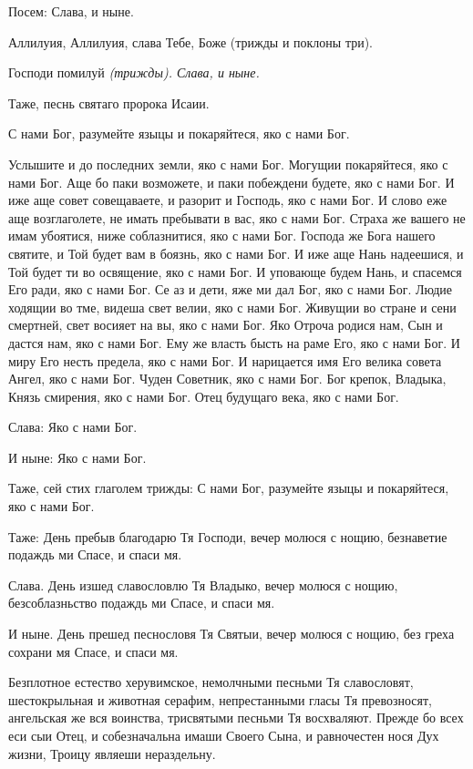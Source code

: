 Посем: Слава, и ныне.


Аллилуия, Аллилуия, слава Тебе, Боже (трижды и поклоны три).


Господи помилуй \itshape (трижды)\normalfont{}. Слава, и ныне.


Таже, песнь святаго пророка Исаии.


С нами Бог, разумейте языцы и покаряйтеся, яко с нами Бог.


Услышите и до последних земли, яко с нами Бог. Могущии покаряйтеся, яко с нами Бог. Аще бо паки возможете, и паки побеждени будете, яко с нами Бог. И иже аще совет совещаваете, и разорит и Господь, яко с нами Бог. И слово еже аще возглаголете, не имать пребывати в вас, яко с нами Бог. Страха же вашего не имам убоятися, ниже соблазнитися, яко с нами Бог. Господа же Бога нашего святите, и Той будет вам в боязнь, яко с нами Бог. И иже аще Нань надеешися, и Той будет ти во освящение, яко с нами Бог. И уповающе будем Нань, и спасемся Его ради, яко с нами Бог. Се аз и дети, яже ми дал Бог, яко с нами Бог. Людие ходящии во тме, видеша свет велии, яко с нами Бог. Живущии во стране и сени смертней, свет восияет на вы, яко с нами Бог. Яко Отроча родися нам, Сын и дастся нам, яко с нами Бог. Ему же власть бысть на раме Его, яко с нами Бог. И миру Его несть предела, яко с нами Бог. И нарицается имя Его велика совета Ангел, яко с нами Бог. Чуден Советник, яко с нами Бог. Бог крепок, Владыка, Князь смирения, яко с нами Бог. Отец будущаго века, яко с нами Бог.


Слава: Яко с нами Бог.


И ныне: Яко с нами Бог.


Таже, сей стих глаголем трижды: С нами Бог, разумейте языцы и покаряйтеся, яко с нами Бог.


Таже: День пребыв благодарю Тя Господи, вечер молюся с нощию, безнаветие подаждь ми Спасе, и спаси мя.


Слава. День изшед славословлю Тя Владыко, вечер молюся с нощию, безсоблазньство подаждь ми Спасе, и спаси мя.


И ныне. День прешед песнословя Тя Святыи, вечер молюся с нощию, без греха сохрани мя Спасе, и спаси мя.


Безплотное естество херувимское, немолчными песньми Тя славословят, шестокрыльная и животная серафим, непрестанными гласы Тя превозносят, ангельская же вся воинства, трисвятыми песньми Тя восхваляют. Прежде бо всех еси сыи Отец, и собезначальна имаши Своего Сына, и равночестен нося Дух жизни, Троицу являеши нераздельну.


